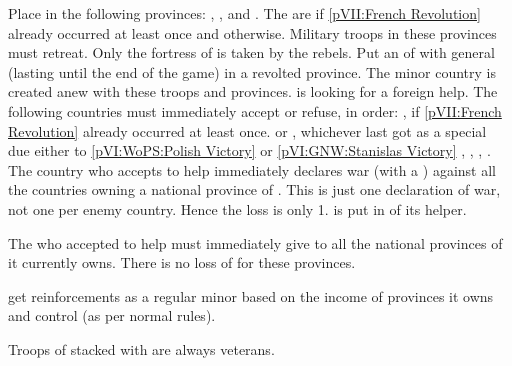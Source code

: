 \phevnt
\aparag Place \REVOLT in the following provinces: \provinceLietuva,
\provinceMazowia, \provinceLublin and \provinceWielkopolska.
\bparag The \REVOLT are \faceplus if \ref{pVII:French Revolution} already
occurred at least once and \facemoins otherwise.
\bparag Military troops in these provinces must retreat.
\bparag Only the fortress of \villeVarsovie is taken by the rebels.
\bparag Put an \ARMY\facemoins of \payspologne with general
 (lasting until the end of the game) in a revolted
province.
\aparag The minor country \payspologne is created anew with these troops and
provinces.
\aparag \payspologne is looking for a foreign help. The following countries
must immediately accept or refuse, in order:
\bparag \FRA, if \ref{pVII:French Revolution} already occurred at least once.
\bparag \FRA or \SUE, whichever last got \payspologne as a special \EG due
either to \ref{pVI:WoPS:Polish Victory} or \ref{pVI:GNW:Stanislas Victory}
\bparag \FRA, \SUE, \AUS, \PRU.
\aparag The country who accepts to help \payspologne immediately declares war
(with a \CB) against all the countries owning a national province of \POL.
\bparag This is just one declaration of war, not one per enemy country. Hence
the \STAB loss is only 1.
\aparag \payspologne is put in \EG of its helper.

\phdipl
\aparag The \MAJ who accepted to help \payspologne must immediately give to
\payspologne all the national provinces of \POL it currently owns.
\bparag There is no loss of \VP for these provinces.

\phadm
\aparag \payspologne get reinforcements as a regular minor based on the income
of provinces it owns and control (as per normal rules).

\phmil
\aparag Troops of \payspologne stacked with \leaderKosciuszko are always
veterans.

